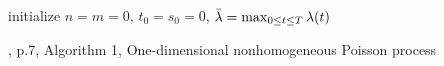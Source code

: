 \begin{algorithm}[H]\label{algo:1d_inhomogenous_pp}

\SetAlgoLined
{}

 initialize $n=m=0$, $t_0 = s_0 = 0$, $\Bar{\lambda} = \max_{0\leq t\leq T}\lambda(t)$\;
 \caption{\cite{lewis1979simulation}, p.7, Algorithm 1, One-dimensional nonhomogeneous Poisson process}
\end{algorithm}
